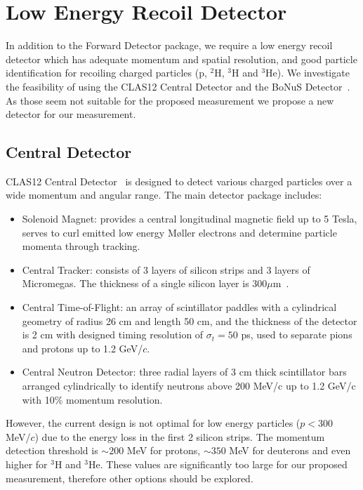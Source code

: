 \section{Low Energy Recoil Detector}
In addition to the Forward Detector package, we require a low energy recoil detector which has adequate momentum and spatial resolution, and good particle identification for recoiling charged particles (p, $^2$H, $^3$H and $^3$He). We investigate the feasibility of using the CLAS12 Central Detector and the BoNuS Detector~\cite{bonus6,bonus12}. As those seem not suitable for the proposed measurement we propose a new detector for our measurement.

\subsection{Central Detector}
CLAS12 Central Detector~\cite{CD} is designed to detect various charged particles over a wide momentum and angular range. The main detector package includes:
\begin{itemize}
\item Solenoid Magnet: provides a central longitudinal magnetic field up to 5 Tesla, serves to curl emitted low energy M{\o}ller electrons and determine particle momenta through tracking.
\item Central Tracker: consists of 3 layers of silicon strips and 3 layers of Micromegas. The thickness of a single silicon layer is $300\mu$m~\cite{SVT}.
\item Central Time-of-Flight: an array of scintillator paddles with a cylindrical geometry of radius 26 cm and length 50 cm, and the thickness of the detector is 2 cm with designed timing resolution of $\sigma_t = 50$ ps, used to separate pions and protons up to 1.2 GeV/$c$.
\item Central Neutron Detector:  three radial layers of 3 cm thick scintillator bars arranged cylindrically to identify neutrons above 200 MeV/c up to 1.2 GeV/c with 10\% momentum resolution.
\end{itemize}

However, the current design is not optimal for low energy particles ($p<300$ MeV/$c$) due to the energy loss in the first 2 silicon strips. The momentum detection threshold is $\sim 200$ MeV for protons, $\sim 350$ MeV for deuterons and even higher for $^3$H and $^3$He. These values are significantly too large for our proposed measurement, therefore other options should be explored.

